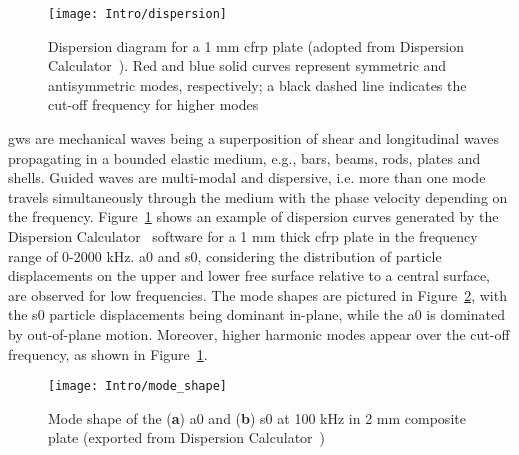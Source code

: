 \documentclass[11pt,a4paper,final]{report}
\theoremstyle{plain}
\begin{document}
\begin{figure}[!htb]
	\begin{center}
		\texttt{[image: Intro/dispersion]}
	\end{center}
	\caption{Dispersion diagram for a 1 \unit{\mm} \acs{cfrp} plate (adopted from Dispersion Calculator~\cite{huber2021dispersion}). Red and blue solid curves represent symmetric and antisymmetric modes, respectively; a black dashed line indicates the cut-off frequency for higher modes}
	\label{fig:dispersion}
\end{figure}
\Acp{gw} are mechanical waves being a superposition of shear and longitudinal waves propagating in a bounded elastic medium, e.g., bars, beams, rods, plates and shells. 
Guided waves are multi-modal and dispersive, i.e. more than one mode travels simultaneously through the medium with the phase velocity depending on the frequency.
Figure~\ref{fig:dispersion} shows an example of dispersion curves generated by the Dispersion Calculator~\cite{huber2021dispersion} software for a 1 \unit{\mm} thick \ac{cfrp} plate in the frequency range of 0-2000 \unit{\kHz}.
\Ac{a0} and \ac{s0}, considering the distribution of particle displacements on the upper and lower free surface relative to a central surface, are observed for low frequencies.
The mode shapes are pictured in Figure~\ref{fig:mode_shape}, with the \ac{s0} particle displacements being dominant in-plane, while the \ac{a0} is dominated by out-of-plane motion.
Moreover, higher harmonic modes appear over the cut-off frequency, as shown in Figure~\ref{fig:dispersion}.

\begin{figure}[!htb]
	\begin{center}
		\texttt{[image: Intro/mode\_shape]}
	\end{center}
	\caption{Mode shape of the (\textbf{a}) \acl{a0} and (\textbf{b}) \acl{s0} at 100 \unit{\kHz} in 2 \unit{\mm} composite plate (exported from Dispersion Calculator~\cite{huber2021dispersion})}
	\label{fig:mode_shape}
\end{figure}
\end{document}
